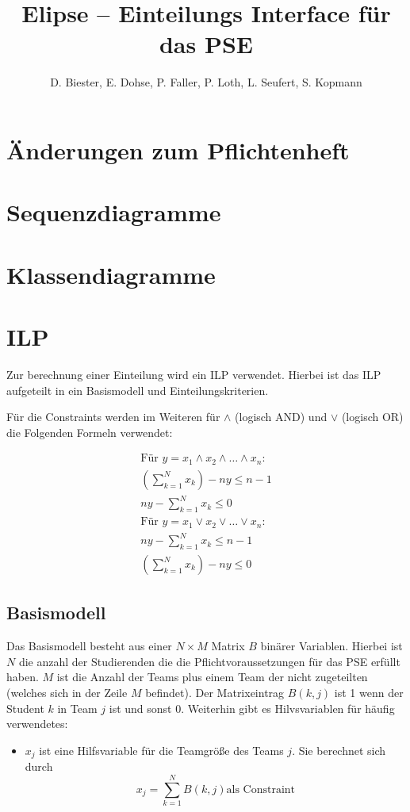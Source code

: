 \documentclass[parskip=full]{scrartcl}
\begin{document}
\title{Elipse -- Einteilungs Interface für das PSE}
\author{D. Biester, E. Dohse, P. Faller, P. Loth, L. Seufert, S. Kopmann}
\zweitgutachter{}

\mytitlepage

\tableofcontents
\pagebreak



\section{Änderungen zum Pflichtenheft}

\section{Sequenzdiagramme}

\section{Klassendiagramme}

\section{ILP}
Zur berechnung einer Einteilung wird ein ILP verwendet. Hierbei ist das ILP
aufgeteilt in ein Basismodell und Einteilungskriterien. 

Für die Constraints werden im Weiteren für $\wedge$ (logisch AND) und
$\vee$ (logisch OR) die Folgenden Formeln verwendet:

\begin{gather*}
\text{Für } y = x_1 \wedge x_2 \wedge \ldots \wedge x_n: \\
\left(\sum_{k=1}^{N}x_k \right)-ny \le n-1\\
ny - \sum_{k=1}^{N}x_k \le 0\\
\text{Für } y = x_1 \vee x_2 \vee \ldots \vee x_n:\\
ny - \sum_{k=1}^{N}x_k \le n-1\\
\left(\sum_{k=1}^{N}x_k \right) - ny \le 0
\end{gather*}
\subsection{Basismodell}
Das Basismodell besteht aus einer $N \times M$ Matrix $B$ binärer Variablen.
Hierbei ist $N$ die anzahl der Studierenden die die Pflichtvoraussetzungen für das PSE
erfüllt haben. $M$ ist die Anzahl der Teams plus einem Team
der nicht zugeteilten (welches sich in der Zeile $M$ befindet). Der
Matrixeintrag $B(k,j)$ ist 1 wenn der Student $k$ in Team $j$ ist und sonst 0.
Weiterhin gibt es Hilvsvariablen für häufig verwendetes: 
\begin{itemize}
  \item $x_j$ ist eine Hilfsvariable für die Teamgröße des Teams $j$. Sie berechnet
sich durch
\begin{equation*}
x_j = \sum_{k = 1}^{N} B(k,j) \text{
als Constraint}
\end{equation*}
\end{itemize}
\end{document}
